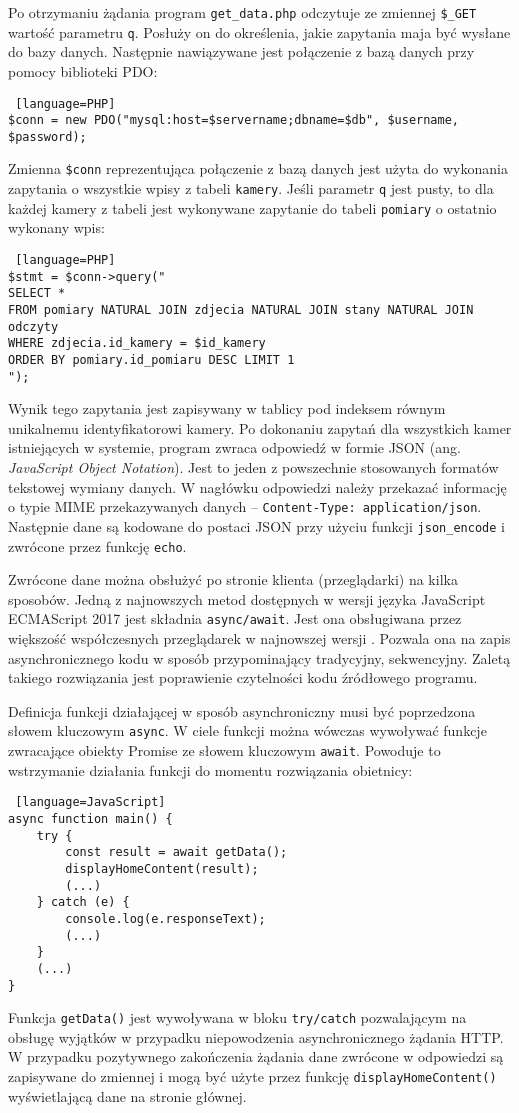\documentclass[a4paper,11pt,twoside]{article}
\begin{document}
Po otrzymaniu żądania program \texttt{get{\_}data.php} odczytuje ze zmiennej \texttt{{\$\_}GET} wartość parametru \texttt{q}. Posłuży on do określenia, jakie zapytania maja być wysłane do bazy danych. Następnie nawiązywane jest połączenie z bazą danych przy pomocy biblioteki PDO:
\begin{lstlisting} [language=PHP]
$conn = new PDO("mysql:host=$servername;dbname=$db", $username, $password);
\end{lstlisting}
Zmienna \texttt{\$conn} reprezentująca połączenie z bazą danych jest użyta do wykonania zapytania o wszystkie wpisy z tabeli \texttt{kamery}. Jeśli parametr \texttt{q} jest pusty, to dla każdej kamery z tabeli jest wykonywane zapytanie do tabeli \texttt{pomiary} o ostatnio wykonany wpis:
\begin{lstlisting} [language=PHP]
$stmt = $conn->query("
SELECT *
FROM pomiary NATURAL JOIN zdjecia NATURAL JOIN stany NATURAL JOIN odczyty
WHERE zdjecia.id_kamery = $id_kamery  
ORDER BY pomiary.id_pomiaru DESC LIMIT 1
");
\end{lstlisting}
Wynik tego zapytania jest zapisywany w tablicy pod indeksem równym unikalnemu identyfikatorowi kamery. Po dokonaniu zapytań dla wszystkich kamer istniejących w systemie, program zwraca odpowiedź w formie JSON (ang. \textit{JavaScript Object Notation}). Jest to jeden z powszechnie stosowanych formatów tekstowej wymiany danych. W nagłówku odpowiedzi należy przekazać informację o typie MIME przekazywanych danych\cite{mime2} -- \texttt{Content-Type: \linebreak application/json}. Następnie dane są kodowane do postaci JSON przy użyciu funkcji \linebreak\texttt{json{\_}encode} i zwrócone przez funkcję \texttt{echo}.

Zwrócone dane można obsłużyć po stronie klienta (przeglądarki) na kilka sposobów. Jedną z najnowszych metod dostępnych w wersji języka JavaScript ECMAScript 2017 jest składnia \texttt{async/await}. Jest ona obsługiwana przez większość współczesnych przeglądarek w najnowszej wersji \cite{async}. Pozwala ona na zapis asynchronicznego kodu w sposób przypominający tradycyjny, sekwencyjny. Zaletą takiego rozwiązania jest poprawienie czytelności kodu źródłowego programu. 

Definicja funkcji działającej w sposób asynchroniczny musi być poprzedzona słowem kluczowym \texttt{async}. W ciele funkcji można wówczas wywoływać funkcje zwracające obiekty Promise ze słowem kluczowym \texttt{await}. Powoduje to wstrzymanie działania funkcji do momentu rozwiązania obietnicy:
\begin{lstlisting} [language=JavaScript]
async function main() {
    try {
        const result = await getData();
        displayHomeContent(result);
        (...)
    } catch (e) {
        console.log(e.responseText);
        (...)
    }
	(...)
}
\end{lstlisting}
Funkcja \texttt{getData()} jest wywoływana w bloku \texttt{try/catch} pozwalającym na obsługę wyjątków w przypadku niepowodzenia asynchronicznego żądania HTTP. W przypadku pozytywnego zakończenia żądania dane zwrócone w odpowiedzi są zapisywane do zmiennej i mogą być użyte przez funkcję \texttt{displayHomeContent()} wyświetlającą dane na stronie głównej.
\end{document}
